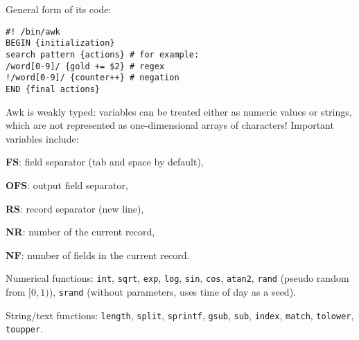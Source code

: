 General form of its code:
\begin{verbatim}
#! /bin/awk
BEGIN {initialization}
search pattern {actions} # for example:
/word[0-9]/ {gold += $2} # regex
!/word[0-9]/ {counter++} # negation
END {final actions}
\end{verbatim}

Awk is weakly typed: variables can be treated either as numeric values or strings, which are not represented as one-dimensional arrays of characters!
Important variables include:
\begin{compactenum}
\item \textbf{FS}: field separator (tab and space by default),
\item \textbf{OFS}: output field separator,
\item \textbf{RS}: record separator (new line),
\item \textbf{NR}: number of the current record,
\item \textbf{NF}: number of fields in the current record. 
\end{compactenum}

Numerical functions: \texttt{int}, \texttt{sqrt}, \texttt{exp}, \texttt{log}, \texttt{sin}, \texttt{cos}, \texttt{atan2}, \texttt{rand} (pseudo random from $[0, 1)$), \texttt{srand} (without parameters, uses time of day as a seed).

String/text functions: \texttt{length}, \texttt{split}, \texttt{sprintf}, \texttt{gsub}, \texttt{sub}, \texttt{index}, \texttt{match}, \texttt{tolower}, \texttt{toupper}.